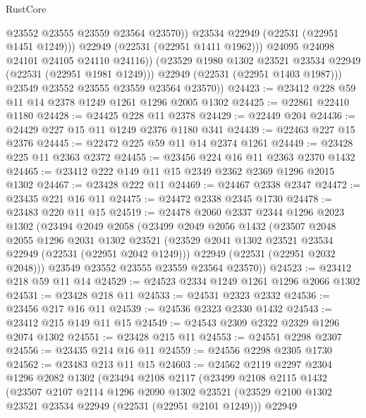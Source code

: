 \begin{lexlean}{RustCore}
\begin{coremodule}
                      @23552
                      @23555
                      @23559
                      @23564
                      @23570))
                  @23534
                  @22949
                  (@22531 (@22951 @1451 @1249)))
                @22949
                (@22531 (@22951 @1411 @1962)))
              @24095
              @24098
              @24101
              @24105
              @24110
              @24116))
          (@23529 @1980 @1302 @23521 @23534 @22949 (@22531 (@22951 @1981 @1249)))
          @22949
          (@22531 (@22951 @1403 @1987)))
        @23549
        @23552
        @23555
        @23559
        @23564
        @23570))
@24423 := @23412 @228 @59 @11 @14 @2378 @1249 @1261 @1296 @2005 @1302
@24425 := @22861 @22410 @1180
@24428 := @24425 @228 @11 @2378
@24429 := @22449 @204
@24436 := @24429 @227 @15 @11 @1249 @2376 @1180 @341
@24439 := @22463 @227 @15 @2376
@24445 := @22472 @225 @59 @11 @14 @2374 @1261
@24449 := @23428 @225 @11 @2363 @2372
@24455 := @23456 @224 @16 @11 @2363 @2370 @1432
@24465 := @23412 @222 @149 @11 @15 @2349 @2362 @2369 @1296 @2015 @1302
@24467 := @23428 @222 @11
@24469 := @24467 @2338 @2347
@24472 := @23435 @221 @16 @11
@24475 := @24472 @2338 @2345 @1730
@24478 := @23483 @220 @11 @15
@24519 := @24478
    @2060
    @2337
    @2344
    @1296
    @2023
    @1302
    (@23494
      @2049
      @2058
      (@23499
        @2049
        @2056
        @1432
        (@23507
          @2048
          @2055
          @1296
          @2031
          @1302
          @23521
          (@23529 @2041 @1302 @23521 @23534 @22949 (@22531 (@22951 @2042 @1249)))
          @22949
          (@22531 (@22951 @2032 @2048)))
        @23549
        @23552
        @23555
        @23559
        @23564
        @23570))
@24523 := @23412 @218 @59 @11 @14
@24529 := @24523 @2334 @1249 @1261 @1296 @2066 @1302
@24531 := @23428 @218 @11
@24533 := @24531 @2323 @2332
@24536 := @23456 @217 @16 @11
@24539 := @24536 @2323 @2330 @1432
@24543 := @23412 @215 @149 @11 @15
@24549 := @24543 @2309 @2322 @2329 @1296 @2074 @1302
@24551 := @23428 @215 @11
@24553 := @24551 @2298 @2307
@24556 := @23435 @214 @16 @11
@24559 := @24556 @2298 @2305 @1730
@24562 := @23483 @213 @11 @15
@24603 := @24562
    @2119
    @2297
    @2304
    @1296
    @2082
    @1302
    (@23494
      @2108
      @2117
      (@23499
        @2108
        @2115
        @1432
        (@23507
          @2107
          @2114
          @1296
          @2090
          @1302
          @23521
          (@23529 @2100 @1302 @23521 @23534 @22949 (@22531 (@22951 @2101 @1249)))
          @22949

\end{coremodule}
\end{lexlean}
